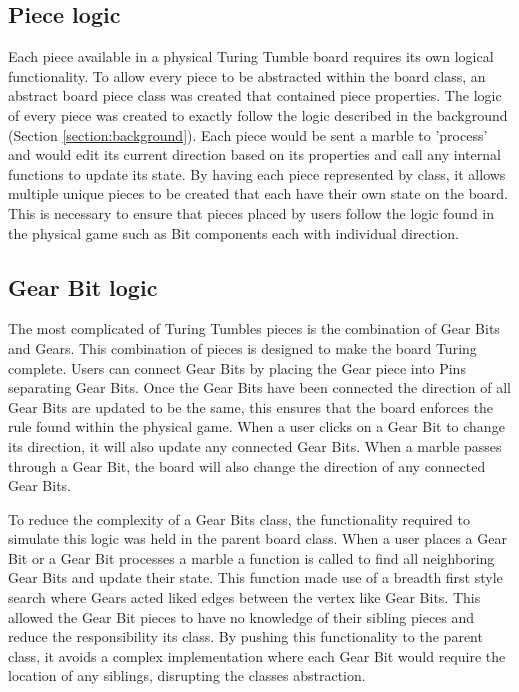 \documentclass{l4proj}
\begin{document}
\subsection{Piece logic}
Each piece available in a physical Turing Tumble board requires its own logical functionality. To allow every piece to be abstracted within the board class, an abstract board piece class was created that contained piece properties. The logic of every piece was created to exactly follow the logic described in the background (Section \ref{section:background}). Each piece would be sent a marble to 'process' and would edit its current direction based on its properties and call any internal functions to update its state. By having each piece represented by class, it allows multiple unique pieces to be created that each have their own state on the board. This is necessary to ensure that pieces placed by users follow the logic found in the physical game such as Bit components each with individual direction.  


\subsection{Gear Bit logic}
The most complicated of Turing Tumbles pieces is the combination of Gear Bits and Gears. This combination of pieces is designed to make the board Turing complete. Users can connect Gear Bits by placing the Gear piece into Pins separating Gear Bits. Once the Gear Bits have been connected the direction of all Gear Bits are updated to be the same, this ensures that the board enforces the rule found within the physical game. When a user clicks on a Gear Bit to change its direction, it will also update any connected Gear Bits. When a marble passes through a Gear Bit, the board will also change the direction of any connected Gear Bits.

To reduce the complexity of a Gear Bits class, the functionality required to simulate this logic was held in the parent board class. When a user places a Gear Bit or a Gear Bit processes a marble a function is called to find all neighboring Gear Bits and update their state. This function made use of a breadth first style search where Gears acted liked edges between the vertex like Gear Bits. This allowed the Gear Bit pieces to have no knowledge of their sibling pieces and reduce the responsibility its class. By pushing this functionality to the parent class, it avoids a complex implementation where each Gear Bit would require the location of any siblings, disrupting the classes abstraction.
\end{document}
